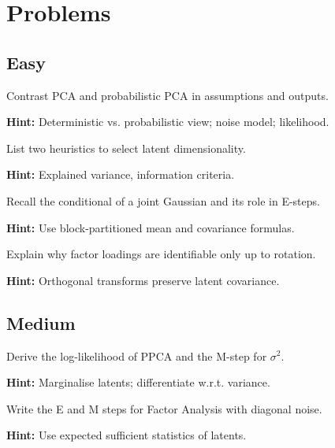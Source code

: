 
\section*{Problems}

\subsection*{Easy}

\begin{problem}
Contrast PCA and probabilistic PCA in assumptions and outputs.

\textbf{Hint:} Deterministic vs. probabilistic view; noise model; likelihood.
\end{problem}

\begin{problem}
List two heuristics to select latent dimensionality.

\textbf{Hint:} Explained variance, information criteria.
\end{problem}

\begin{problem}
Recall the conditional of a joint Gaussian and its role in E-steps.

\textbf{Hint:} Use block-partitioned mean and covariance formulas.
\end{problem}

\begin{problem}
Explain why factor loadings are identifiable only up to rotation.

\textbf{Hint:} Orthogonal transforms preserve latent covariance.
\end{problem}

\subsection*{Medium}

\begin{problem}
Derive the log-likelihood of PPCA and the M-step for $\sigma^2$.

\textbf{Hint:} Marginalise latents; differentiate w.r.t. variance.
\end{problem}

\begin{problem}[EM for FA]
Write the E and M steps for Factor Analysis with diagonal noise.

\textbf{Hint:} Use expected sufficient statistics of latents.
\end{problem}

